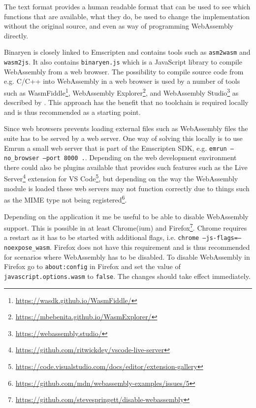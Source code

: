 The text format provides a human readable format that can be used to see which functions that are available, what they do, be used to change the implementation without the original source, and even as way of programming WebAssembly directly.


Binaryen is closely linked to Emscripten and contains tools such as \texttt{asm2wasm} and \texttt{wasm2js}. It also contains \texttt{binaryen.js} which is a JavaScript library to compile WebAssembly from a web browser. The possibility to compile source code from e.g. C/C++ into WebAssembly in a web browser is used by a number of tools such as WasmFiddle\footnote{\url{https://wasdk.github.io/WasmFiddle/}}, WebAssembly Explorer\footnote{\url{https://mbebenita.github.io/WasmExplorer/}}, and WebAssembly Studio\footnote{\url{https://webassembly.studio/}} as described by \textcite{Rourke2018}. This approach has the benefit that no toolchain is required locally and is thus recommended as a starting point.

Since web browsers prevents loading external files such as WebAssembly files the suite has to be served by a web server. One way of solving this locally is to use Emrun a small web server that is part of the Emscripten SDK, e.g. \texttt{emrun --no\_browser --port 8000 .}. Depending on the web development environment there could also be plugins available that provides such features such as the Live Server\footnote{\url{https://github.com/ritwickdey/vscode-live-server}} extension for VS Code\footnote{\url{https://code.visualstudio.com/docs/editor/extension-gallery}}, but depending on the way the WebAssembly module is loaded these web servers may not function correctly due to things such as the MIME type not being registered\footnote{\url{https://github.com/mdn/webassembly-examples/issues/5}}.

Depending on the application it me be useful to be able to disable WebAssembly support. This is possible in at least Chrome(ium) and Firefox\footnote{\url{https://github.com/stevespringett/disable-webassembly}}. Chrome requires a restart as it has to be started with additional flags, i.e. \texttt{chrome --js-flags=--noexpose\_wasm}. Firefox does not have this requirement and is thus recommended for scenarios where WebAssembly has to be disabled. To disable WebAssembly in Firefox go to \texttt{about:config} in Firefox and set the value of \texttt{javascript.options.wasm} to \texttt{false}. The changes should take effect immediately.

